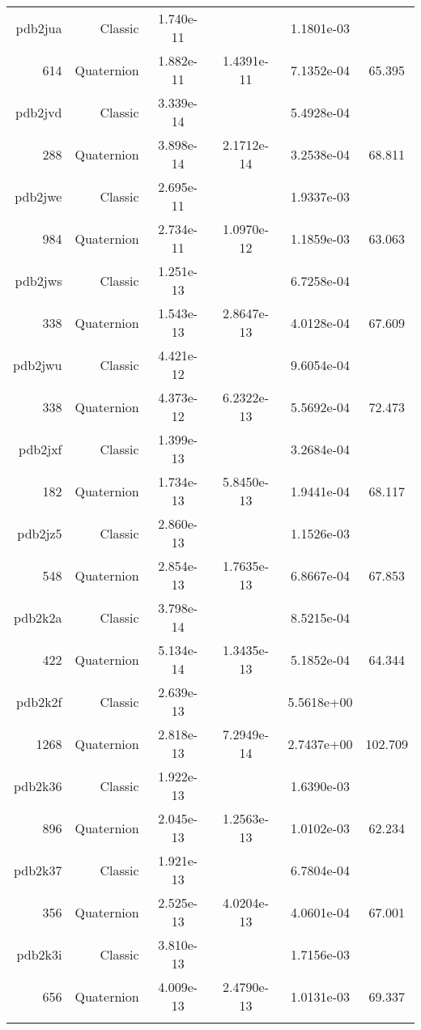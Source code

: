 \begin{xltabular}{\textwidth}{r|rS[table-format=1.3e+2]S[table-format=1.4e+2]S[table-format=1.4e+2]S[table-format=-1.3]}
pdb2jua & Classic & 1.740e-11 &  & 1.1801e-03 & \\
614 & Quaternion & 1.882e-11 & 1.4391e-11 & 7.1352e-04 & 65.395\\  \addlinespace
pdb2jvd & Classic & 3.339e-14 &  & 5.4928e-04 & \\
288 & Quaternion & 3.898e-14 & 2.1712e-14 & 3.2538e-04 & 68.811\\  \addlinespace
pdb2jwe & Classic & 2.695e-11 &  & 1.9337e-03 & \\
984 & Quaternion & 2.734e-11 & 1.0970e-12 & 1.1859e-03 & 63.063\\  \addlinespace
pdb2jws & Classic & 1.251e-13 &  & 6.7258e-04 & \\
338 & Quaternion & 1.543e-13 & 2.8647e-13 & 4.0128e-04 & 67.609\\  \addlinespace
pdb2jwu & Classic & 4.421e-12 &  & 9.6054e-04 & \\
338 & Quaternion & 4.373e-12 & 6.2322e-13 & 5.5692e-04 & 72.473\\  \addlinespace
pdb2jxf & Classic & 1.399e-13 &  & 3.2684e-04 & \\
182 & Quaternion & 1.734e-13 & 5.8450e-13 & 1.9441e-04 & 68.117\\  \addlinespace
pdb2jz5 & Classic & 2.860e-13 &  & 1.1526e-03 & \\
548 & Quaternion & 2.854e-13 & 1.7635e-13 & 6.8667e-04 & 67.853\\  \addlinespace
pdb2k2a & Classic & 3.798e-14 &  & 8.5215e-04 & \\
422 & Quaternion & 5.134e-14 & 1.3435e-13 & 5.1852e-04 & 64.344\\  \addlinespace
pdb2k2f & Classic & 2.639e-13 &  & 5.5618e+00 & \\
1268 & Quaternion & 2.818e-13 & 7.2949e-14 & 2.7437e+00 & 102.709\\  \addlinespace
pdb2k36 & Classic & 1.922e-13 &  & 1.6390e-03 & \\
896 & Quaternion & 2.045e-13 & 1.2563e-13 & 1.0102e-03 & 62.234\\  \addlinespace
pdb2k37 & Classic & 1.921e-13 &  & 6.7804e-04 & \\
356 & Quaternion & 2.525e-13 & 4.0204e-13 & 4.0601e-04 & 67.001\\  \addlinespace
pdb2k3i & Classic & 3.810e-13 &  & 1.7156e-03 & \\
656 & Quaternion & 4.009e-13 & 2.4790e-13 & 1.0131e-03 & 69.337\\  \addlinespace

\end{xltabular}
